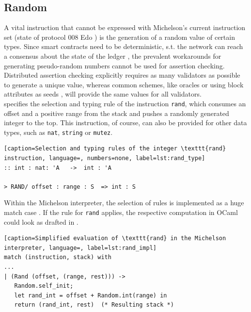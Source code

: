 \subsection{Random}
A vital instruction that cannot be expressed with Michelson's current instruction set (state of protocol 008 Edo \cite{tezos_docs}) is the generation of a random value of certain types. Since smart contracts need to be deterministic, s.t. the network can reach a consensus about the state of the ledger \cite{chatterjee_probabilistic_2019}, the prevalent workarounds for generating pseudo-random numbers cannot be used for assertion checking. Distributed assertion checking explicitly requires as many validators as possible to generate a unique value, whereas common schemes, like oracles or using block attributes as seeds \cite{chatterjee_probabilistic_2019}, will provide the same values for all validators.\\
 specifies the selection and typing rule of the instruction \texttt{rand}, which consumes an offset and a positive range from the stack and pushes a randomly generated integer to the top. This instruction, of course, can also be provided for other data types, such as \texttt{nat}, \texttt{string} or \texttt{mutez}.
\lstset{upquote=true}
\begin{lstlisting}[caption=Selection and typing rules of the integer \texttt{rand} instruction, language=, numbers=none, label=lst:rand_type]
:: int : nat: 'A   ->  int : 'A

> RAND/ offset : range : S  => int : S
\end{lstlisting}

Within the Michelson interpreter, the selection of rules is implemented as a huge match case \cite{tezos_repo}. If the rule for \texttt{rand} applies, the respective computation in OCaml could look as drafted in .
\begin{lstlisting}[caption=Simplified evaluation of \texttt{rand} in the Michelson interpreter, language=, label=lst:rand_impl]
match (instruction, stack) with
...
| (Rand (offset, (range, rest))) -> 
   Random.self_init;
   let rand_int = offset + Random.int(range) in
   return (rand_int, rest)  (* Resulting stack *)
\end{lstlisting}

